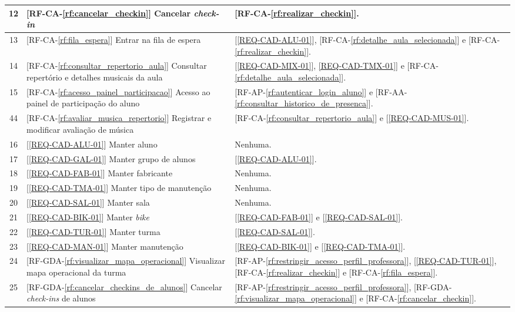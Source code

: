 \begin{longtable}{|c|p{6cm}|p{7cm}|}
    12 & [RF-CA-\ref{rf:cancelar_checkin}] Cancelar \textit{check-in} & [RF-CA-\ref{rf:realizar_checkin}]. \\ \hline
    13 & [RF-CA-\ref{rf:fila_espera}] Entrar na fila de espera & [\ref{REQ-CAD-ALU-01}], [RF-CA-\ref{rf:detalhe_aula_selecionada}] e [RF-CA-\ref{rf:realizar_checkin}]. \\ \hline
    14 & [RF-CA-\ref{rf:consultar_repertorio_aula}] Consultar repertório e detalhes musicais da aula & [\ref{REQ-CAD-MIX-01}], \ref{REQ-CAD-TMX-01}] e [RF-CA-\ref{rf:detalhe_aula_selecionada}]. \\ \hline
    15 & [RF-CA-\ref{rf:acesso_painel_participacao}] Acesso ao painel de participação do aluno & [RF-AP-\ref{rf:autenticar_login_aluno}] e [RF-AA-\ref{rf:consultar_historico_de_presenca}]. \\ \hline
    44 & [RF-CA-\ref{rf:avaliar_musica_repertorio}] Registrar e modificar avaliação de música & [RF-CA-\ref{rf:consultar_repertorio_aula}] e [\ref{REQ-CAD-MUS-01}]. \\ \hline
    16 & [\ref{REQ-CAD-ALU-01}] Manter aluno & Nenhuma. \\ \hline
    17 & [\ref{REQ-CAD-GAL-01}] Manter grupo de alunos & [\ref{REQ-CAD-ALU-01}]. \\ \hline
    18 & [\ref{REQ-CAD-FAB-01}] Manter fabricante & Nenhuma. \\ \hline
    19 & [\ref{REQ-CAD-TMA-01}] Manter tipo de manutenção & Nenhuma. \\ \hline
    20 & [\ref{REQ-CAD-SAL-01}] Manter sala & Nenhuma. \\ \hline
    21 & [\ref{REQ-CAD-BIK-01}] Manter \textit{bike} & [\ref{REQ-CAD-FAB-01}] e [\ref{REQ-CAD-SAL-01}]. \\ \hline
    22 & [\ref{REQ-CAD-TUR-01}] Manter turma & [\ref{REQ-CAD-SAL-01}]. \\ \hline
    23 & [\ref{REQ-CAD-MAN-01}] Manter manutenção & [\ref{REQ-CAD-BIK-01}] e [\ref{REQ-CAD-TMA-01}]. \\ \hline
    24 & [RF-GDA-\ref{rf:visualizar_mapa_operacional}] Visualizar mapa operacional da turma & [RF-AP-\ref{rf:restringir_acesso_perfil_professora}], [\ref{REQ-CAD-TUR-01}], [RF-CA-\ref{rf:realizar_checkin}] e [RF-CA-\ref{rf:fila_espera}]. \\ \hline
    25 & [RF-GDA-\ref{rf:cancelar_checkins_de_alunos}] Cancelar \textit{check-ins} de alunos & [RF-AP-\ref{rf:restringir_acesso_perfil_professora}], [RF-GDA-\ref{rf:visualizar_mapa_operacional}] e [RF-CA-\ref{rf:cancelar_checkin}]. \\ \hline

\end{longtable}
